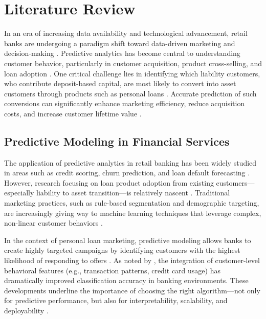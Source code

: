\documentclass[12pt]{article}
\begin{document}
\section{Literature Review}
In an era of increasing data availability and technological advancement, retail banks are undergoing a paradigm shift toward data-driven marketing and decision-making \citep{He2022ImpactStudy}. Predictive analytics has become central to understanding customer behavior, particularly in customer acquisition, product cross-selling, and loan adoption \citep{Boustani2024ImprovingNetworks}. One critical challenge lies in identifying which liability customers, who contribute deposit-based capital, are most likely to convert into asset customers through products such as personal loans \citep{Chang2024TowardsStudy}. Accurate prediction of such conversions can significantly enhance marketing efficiency, reduce acquisition costs, and increase customer lifetime value \citep{Ulug2025OptimizedProgramming}.

\subsection{Predictive Modeling in Financial Services}
The application of predictive analytics in retail banking has been widely studied in areas such as credit scoring, churn prediction, and loan default forecasting \citep{Singh2024InvestigatingManagement}. However, research focusing on loan product adoption from existing customers—especially liability to asset transition—is relatively nascent \citep{Vaduva2024ImprovingTechniques}. Traditional marketing practices, such as rule-based segmentation and demographic targeting, are increasingly giving way to machine learning techniques that leverage complex, non-linear customer behaviors \citep{deWaal2024ConsumersLearning}.

In the context of personal loan marketing, predictive modeling allows banks to create highly targeted campaigns by identifying customers with the highest likelihood of responding to offers \citep{Rahman2024TRANSFORMINGLEARNING}. As noted by \cite{BharathiS2022AnCustomers}, the integration of customer-level behavioral features (e.g., transaction patterns, credit card usage) has dramatically improved classification accuracy in banking environments. These developments underline the importance of choosing the right algorithm—not only for predictive performance, but also for interpretability, scalability, and deployability \citep{Al-Quraishi2025BridgingPrediction}.
\end{document}
